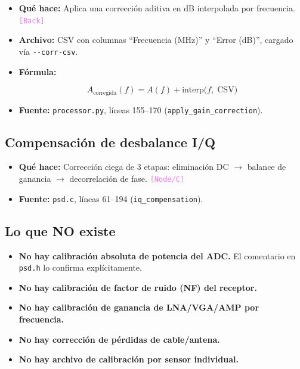\documentclass[11pt,a4paper]{article}
\newcommand{\where}[1]{\textcolor{violet}{\texttt{[#1]}}}
\begin{document}
\begin{itemize}
\item \textbf{Qué hace:} Aplica una corrección aditiva en dB interpolada por frecuencia. \where{Back}
\item \textbf{Archivo:} CSV con columnas ``Frecuencia (MHz)'' y ``Error (dB)'', cargado vía \texttt{-{}-corr-csv}.
\item \textbf{Fórmula:}

\begin{equation}
A_{\text{corregida}}(f) = A(f) + \text{interp}\big(f,\; \text{CSV}\big)
\label{eq:gain_corr}
\end{equation}

\item \textbf{Fuente:} \texttt{processor.py}, líneas 155--170 (\texttt{apply\_gain\_correction}).
\end{itemize}

\subsection{Compensación de desbalance I/Q}

\begin{itemize}
\item \textbf{Qué hace:} Corrección ciega de 3 etapas: eliminación DC $\to$ balance de ganancia $\to$ decorrelación de fase. \where{Node/C}
\item \textbf{Fuente:} \texttt{psd.c}, líneas 61--194 (\texttt{iq\_compensation}).
\end{itemize}

\subsection{Lo que NO existe}

\begin{itemize}
\item \textbf{No hay calibración absoluta de potencia del ADC.} El comentario en \texttt{psd.h} lo confirma explícitamente.
\item \textbf{No hay calibración de factor de ruido (NF) del receptor.}
\item \textbf{No hay calibración de ganancia de LNA/VGA/AMP por frecuencia.}
\item \textbf{No hay corrección de pérdidas de cable/antena.}
\item \textbf{No hay archivo de calibración por sensor individual.}
\end{itemize}
\end{document}
